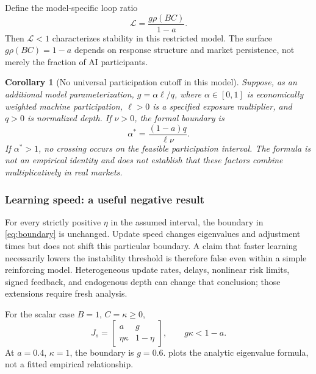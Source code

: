 \documentclass[10pt,twocolumn,letterpaper]{article}
\newtheorem{corollary}[theorem]{Corollary}
\theoremstyle{definition}
\theoremstyle{remark}
\begin{document}
Define the model-specific loop ratio
\begin{equation}
 \mathcal L=\frac{g\rho(BC)}{1-a}.
 \label{eq:loopratio}
\end{equation}
Then $\mathcal L<1$ characterizes stability in this restricted model. The surface $g\rho(BC)=1-a$ depends on response structure and market persistence, not merely the fraction of AI participants.

\begin{corollary}[No universal participation cutoff in this model]
\label{cor:participation}
Suppose, as an additional model parameterization, $g=\alpha\ell/q$, where $\alpha\in[0,1]$ is economically weighted machine participation, $\ell>0$ is a specified exposure multiplier, and $q>0$ is normalized depth. If $\nu>0$, the formal boundary is
\begin{equation}
 \alpha^*=\frac{(1-a)q}{\ell\nu}.
 \label{eq:alphastar}
\end{equation}
If $\alpha^*>1$, no crossing occurs on the feasible participation interval. The formula is not an empirical identity and does not establish that these factors combine multiplicatively in real markets.
\end{corollary}

\subsubsection{Learning speed: a useful negative result}
For every strictly positive $\eta$ in the assumed interval, the boundary in \cref{eq:boundary} is unchanged. Update speed changes eigenvalues and adjustment times but does not shift this particular boundary. A claim that faster learning necessarily lowers the instability threshold is therefore false even within a simple reinforcing model. Heterogeneous update rates, delays, nonlinear risk limits, signed feedback, and endogenous depth can change that conclusion; those extensions require fresh analysis.

For the scalar case $B=1$, $C=\kappa\geq0$,
\begin{equation}
 J_s=\begin{bmatrix}a&g\\\eta\kappa&1-\eta\end{bmatrix},
 \qquad g\kappa<1-a.
 \label{eq:scalar}
\end{equation}
At $a=0.4$, $\kappa=1$, the boundary is $g=0.6$.  plots the analytic eigenvalue formula, not a fitted empirical relationship.
\end{document}
